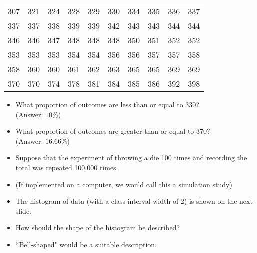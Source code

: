 \documentclass[]{report}
\begin{document}
	\begin{center}
		\begin{tabular}{|c c c c c c c c c c|}
			\hline
			307 & 321 & 324 & 328 & 329 & 330 & 334 & 335 & 336 &337 \\
			337 & 337 & 338 & 339 & 339 & 342 & 343 & 343 & 344 &344 \\
			346 & 346 & 347 & 348 & 348 & 348 & 350 & 351 & 352 &352 \\
			353 & 353 & 353 & 354 & 354 & 356 & 356 & 357 & 357 &358 \\
			358 & 360 & 360 & 361 & 362 & 363 & 365 & 365 & 369 &369 \\
			370 & 370 & 374 & 378 & 381 & 384 & 385 & 386 & 392 &398 \\
			\hline
		\end{tabular}
	\end{center}
	\normalsize
	\begin{itemize}
		\item What proportion of outcomes are less than or equal to 330? \\ (Answer: $10\%$)
		\item What proportion of outcomes are greater than or equal to 370?\\ (Answer: $16.66\%$)
	\end{itemize}
	
	
	
	
	
	
	
	\begin{itemize}
		\item Suppose that the experiment of throwing a die 100 times and recording the total was repeated 100,000 times.
		\item (If implemented on a computer, we would call this a simulation study)
		\item The histogram of data (with a class interval width of 2) is shown on the next slide.
		\item How should the shape of the histogram be described?
		\item ``Bell-shaped" would be a suitable description.
	\end{itemize}
	
\end{document}
